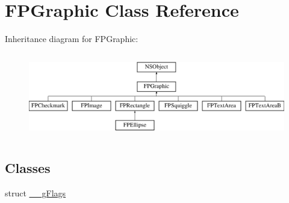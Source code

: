 \hypertarget{interface_f_p_graphic}{}\section{F\+P\+Graphic Class Reference}
\label{interface_f_p_graphic}
Inheritance diagram for F\+P\+Graphic\+:\begin{figure}[H]
\begin{center}
\leavevmode
\includegraphics[height=3.771044cm]{interface_f_p_graphic}
\end{center}
\end{figure}
\subsection*{Classes}
\begin{DoxyCompactItemize}
\item 
struct \mbox{\hyperlink{struct_f_p_graphic_1_1____g_flags}{\+\_\+\+\_\+g\+Flags}}
\end{DoxyCompactItemize}
